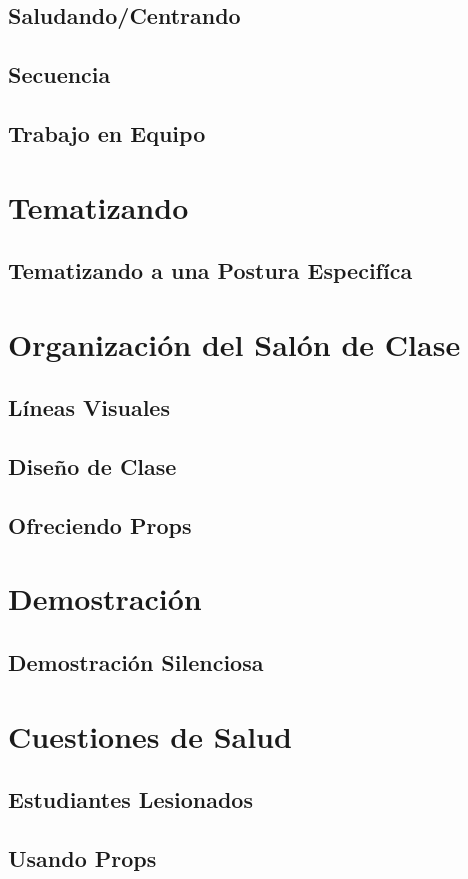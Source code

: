 \subsection{Saludando/Centrando}
\subsection{Secuencia}
\subsection{Trabajo en Equipo}
\section{Tematizando}
\subsection{Tematizando a una Postura Especifíca}
\section{Organización del Salón de Clase}
\subsection{Líneas Visuales}
\subsection{Diseño de Clase}
\subsection{Ofreciendo Props}
\section{Demostración}
\subsection{Demostración Silenciosa}
\section{Cuestiones de Salud}
\subsection{Estudiantes Lesionados}
\subsection{Usando Props}

